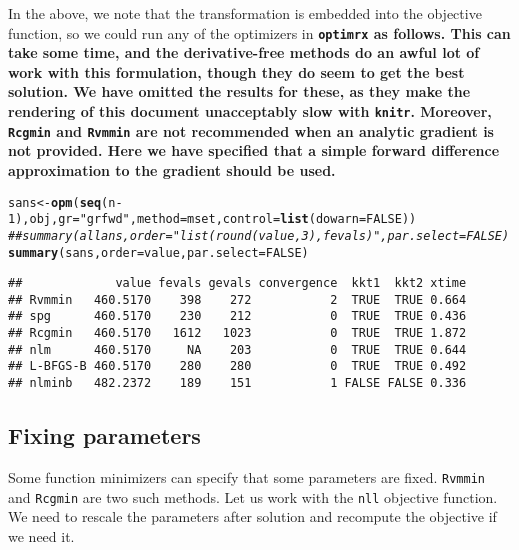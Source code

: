 \documentclass[11pt]{article}\usepackage[]{graphicx}\usepackage[]{color}
\makeatletter
\newcommand{\hlnum}[1]{\textcolor[rgb]{0.686,0.059,0.569}{#1}}%
\newcommand{\hlstr}[1]{\textcolor[rgb]{0.192,0.494,0.8}{#1}}%
\newcommand{\hlcom}[1]{\textcolor[rgb]{0.678,0.584,0.686}{\textit{#1}}}%
\newcommand{\hlopt}[1]{\textcolor[rgb]{0,0,0}{#1}}%
\newcommand{\hlstd}[1]{\textcolor[rgb]{0.345,0.345,0.345}{#1}}%
\newcommand{\hlkwb}[1]{\textcolor[rgb]{0.69,0.353,0.396}{#1}}%
\newcommand{\hlkwc}[1]{\textcolor[rgb]{0.333,0.667,0.333}{#1}}%
\newcommand{\hlkwd}[1]{\textcolor[rgb]{0.737,0.353,0.396}{\textbf{#1}}}%
\newenvironment{kframe}{%
 \def\at@end@of@kframe{}%
 \ifinner\ifhmode%
  \def\at@end@of@kframe{\end{minipage}}%
  \begin{minipage}{\columnwidth}%
 \fi\fi%
 \def\FrameCommand##1{\hskip\@totalleftmargin \hskip-\fboxsep
 \colorbox{shadecolor}{##1}\hskip-\fboxsep
     \hskip-\linewidth \hskip-\@totalleftmargin \hskip\columnwidth}%
 \MakeFramed {\advance\hsize-\width
   \@totalleftmargin\z@ \linewidth\hsize
   \@setminipage}}%
 {\par\unskip\endMakeFramed%
 \at@end@of@kframe}
\newenvironment{knitrout}{}{} %
\newcommand{\code}[1]{{\tt#1}}
\newcommand{\pkg}[1]{\bf{\tt#1}\rm }
\makeatother
\begin{document}
In the above, we note that the transformation is embedded into the objective function, 
so we could run any of the optimizers in \pkg{optimrx} as follows. This can take some time, 
and the derivative-free
methods do an awful lot of work with this formulation, though they do seem to get the
best solution. We have omitted the results for these, as they make the rendering of
this document unacceptably slow with \code{knitr}. Moreover, \code{Rcgmin}
and \code{Rvmmin} are not recommended when an analytic gradient is not provided. Here
we have specified that a simple forward difference approximation to the gradient
should be used. 

\begin{knitrout}\scriptsize
{}\color{fgcolor}\begin{kframe}
\begin{alltt}
\hlstd{sans}\hlkwb{<-} \hlkwd{opm}\hlstd{(}\hlkwd{seq}\hlstd{(n}\hlopt{-}\hlnum{1}\hlstd{), obj,} \hlkwc{gr}\hlstd{=}\hlstr{"grfwd"}\hlstd{,} \hlkwc{method}\hlstd{=mset,} \hlkwc{control}\hlstd{=}\hlkwd{list}\hlstd{(}\hlkwc{dowarn}\hlstd{=}\hlnum{FALSE}\hlstd{))}
\hlcom{## summary(allans, order = "list(round(value, 3), fevals)", par.select = FALSE)}
\hlkwd{summary}\hlstd{(sans,} \hlkwc{order} \hlstd{= value,} \hlkwc{par.select} \hlstd{=} \hlnum{FALSE}\hlstd{)}
\end{alltt}
\begin{verbatim}
##             value fevals gevals convergence  kkt1  kkt2 xtime
## Rvmmin   460.5170    398    272           2  TRUE  TRUE 0.664
## spg      460.5170    230    212           0  TRUE  TRUE 0.436
## Rcgmin   460.5170   1612   1023           0  TRUE  TRUE 1.872
## nlm      460.5170     NA    203           0  TRUE  TRUE 0.644
## L-BFGS-B 460.5170    280    280           0  TRUE  TRUE 0.492
## nlminb   482.2372    189    151           1 FALSE FALSE 0.336
\end{verbatim}
\end{kframe}
\end{knitrout}

\subsection{Fixing parameters}

Some function minimizers can specify that some parameters are fixed. \code{Rvmmin} and
\code{Rcgmin} are two such methods. Let us work with the \code{nll} objective function.
We need to rescale the parameters after solution and recompute the objective if we need it.
\end{document}
